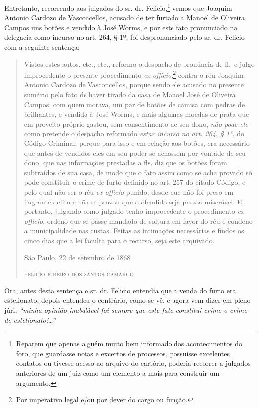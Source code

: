 {Entretanto, recorrendo aos julgados do sr. dr. Felicio,\footnote{
  Reparem que apenas alguém muito bem informado dos acontecimentos do
  foro, que guardasse notas e excertos de processos, possuísse
  excelentes contatos ou tivesse acesso ao arquivo do cartório, poderia
  recorrer a julgados anteriores de um juiz como um elemento a mais para
  construir um argumento.} vemos que Joaquim Antonio Cardozo de
Vasconcellos, acusado de ter furtado a Manoel de Oliveira Campos uns
botões e vendido à José Worms, e por este fato pronunciado na delegacia
como incurso no art. 264, § 1º, foi despronunciado pelo sr. dr. Felicio
com a seguinte sentença:

\begin{quote}
Vistos estes autos, etc., etc., reformo o despacho de pronúncia de
fl.~e julgo improcedente o presente procedimento
\emph{ex-officio},\footnote{ Por imperativo legal e/ou por dever do
  cargo ou função.} contra o réu Joaquim Antonio Cardozo de
Vasconcellos, porque sendo ele acusado no presente sumário pelo fato de
haver tirado da casa de Manoel José de Oliveira Campos, com quem morava,
um par de botões de camisa com pedras de brilhantes, e vendido à José
Worms, e mais algumas moedas de prata que em proveito próprio gastou,
sem consentimento de seu dono, \emph{não pode ele} como pretende o
despacho reformado \emph{estar incurso no art. 264}, \emph{§ 1º}, do
Código Criminal, porque para isso e em relação aos botões, era
necessário que antes de vendidos eles em seu poder se achassem por
vontade de seu dono, que nas informações prestadas a fls. diz que os
botões foram subtraídos de sua casa, de modo que o fato assim como se
acha provado só pode constituir o crime de furto definido no art. 257 do
citado Código, e pelo qual não ser o réu \emph{ex-officio} punido, desde
que não foi preso em flagrante delito e não se provou que o ofendido
seja pessoa miserável. E, portanto, julgando como julgado tenho
improcedente o procedimento \emph{ex-officio}, ordeno que se passe
mandado de soltura em favor do réu e condeno a municipalidade nas
custas. Feitas as intimações necessárias e findos os cinco dias que a
lei faculta para o recurso, seja este arquivado.

\begin{flushright}
São Paulo, 22 de setembro de 1868

\textsc{felicio ribeiro dos santos camargo}
\end{flushright}
\end{quote}

Ora, antes desta sentença o sr. dr. Felicio entendia que a venda do
furto era estelionato, depois entendeu o contrário, como se vê, e agora
vem dizer em pleno júri, \emph{``minha opinião inabalável foi sempre que
este fato constitui crime o crime de estelionato!}\ldots{}''

}
